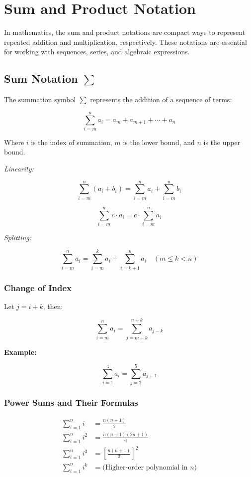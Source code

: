 \newpage
\section{Sum and Product Notation}

In mathematics, the sum and product notations are compact ways to represent repeated addition and 
multiplication, respectively. These notations are essential for working with sequences, series, and 
algebraic expressions.

\subsection{Sum Notation \texorpdfstring{\(\sum\)}{∑}}

The summation symbol \(\sum\) represents the addition of a sequence of terms:

\[
    \sum_{i = m}^{n} a_i = a_m + a_{m+1} + \cdots + a_n
\]

Where \(i\) is the index of summation, \(m\) is the lower bound, and \(n\) is the upper bound.

\emph{Linearity:}

\[
    \sum_{i = m}^{n} (a_i + b_i) = \sum_{i = m}^{n} a_i + \sum_{i = m}^{n} b_i
\]
    
\[
    \sum_{i = m}^{n} c \cdot a_i = c \cdot \sum_{i = m}^{n} a_i
\]

\emph{Splitting:}
    
\[
    \sum_{i = m}^{n} a_i = \sum_{i = m}^{k} a_i + \sum_{i = k+1}^{n} a_i \quad (m \le k < n)
\]

\subsubsection{Change of Index}

Let \(j = i + k\), then:

\[
    \sum_{i = m}^{n} a_i = \sum_{j = m + k}^{n + k} a_{j - k}
\]

\textbf{Example:}

\[
    \sum_{i = 1}^{4} a_i = \sum_{j = 2}^{5} a_{j - 1}
\]

\subsubsection{Power Sums and Their Formulas}

\begin{align*}
    \sum_{i = 1}^{n} i &= \frac{n(n+1)}{2} \\
    \sum_{i = 1}^{n} i^2 &= \frac{n(n+1)(2n+1)}{6} \\
    \sum_{i = 1}^{n} i^3 &= {\left[\frac{n(n+1)}{2}\right]}^2 \\
    \sum_{i = 1}^{n} i^k &= \text{(Higher-order polynomial in \(n\))}
\end{align*}

